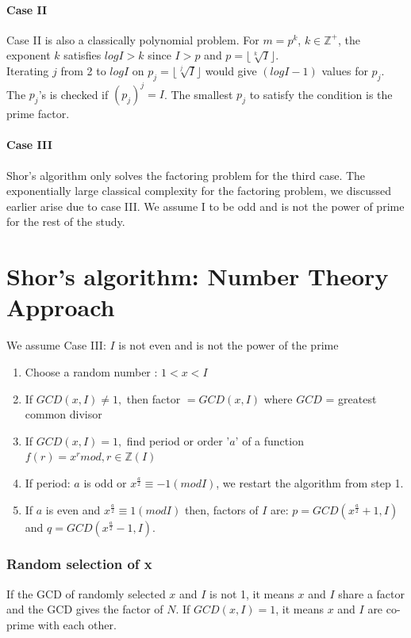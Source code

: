 \paragraph{Case II \\}
Case II is also a classically polynomial problem. For $m = p^k$, $k \in \mathbb{Z}^+$, the exponent $k$ satisfies $ logI > k$ since $I > p$ and  $p = \lfloor \sqrt[k]{I} \rfloor$. \\
Iterating $j$ from 2 to $log I$ on $p_j = \lfloor \sqrt[j]{I} \rfloor$ would give  $(log I- 1)$ values for $p_j$. The $p_j$'s is checked if $(p_j)^j = I$. The smallest $p_j$ to satisfy the condition is the prime factor.
\paragraph{Case III \\}
Shor's algorithm only solves the factoring problem for the third case. The exponentially large classical complexity for the factoring problem, we discussed earlier arise due to case III. We assume I to be odd and is not the power of prime for the rest of the study.
\section{Shor's algorithm: Number Theory Approach}
We assume Case III: $I$ is not even and is not the power of the prime
 \renewcommand{\labelenumi}{\arabic{enumi}}
\begin{enumerate}
    \item Choose a random number : $ 1 < x < I $
    \item If $GCD(x , I ) \neq 1,$ then factor $= GCD(x, I)$ where $GCD$  = greatest common divisor
    \item If $GCD(x, I) = 1,$ find period or order '$a$' of a function
    $f(r) = x^r mod     , r\in \mathbb{Z}(I)$
    \item If period: $a$ is odd or $x^\frac{a}{2} \equiv -1(modI)$, we restart the algorithm from step 1.
    \item If $a$ is even and $x^\frac{a}{2} \equiv 1(modI)$ then, factors of $I$ are: $p= GCD(x^
    \frac{a}{2} + 1, I)$ and $q = GCD(x^\frac{a}{2} - 1, I)$.
\end{enumerate}

\subsubsection{Random selection of x}
    If the GCD of randomly selected $x$ and $I$ is not 1, it means $x$ and $I$ share a factor and the GCD gives the factor of $N$. If $GCD(x, I) = 1$, it means $x$ and $I$ are co-prime with each other.
